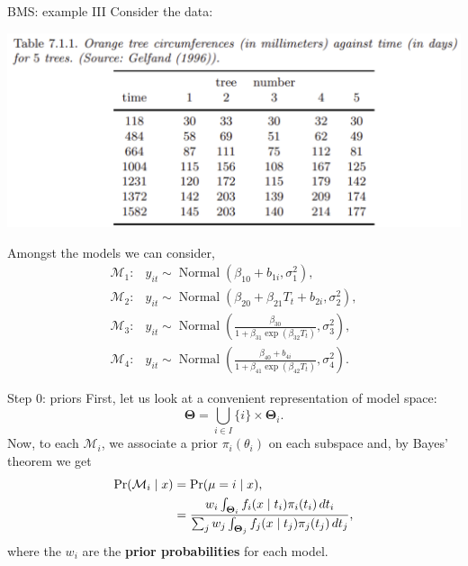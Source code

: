 \begin{frame}{BMS: example III}
Consider the data:
 \begin{center}
 \includegraphics[scale=0.3]{figures/oranges.pdf}
\end{center}
Amongst the models we can consider, 
\begin{align*}
\mathcal{M}_1 :& y_{it} \sim \operatorname{Normal}(\beta_{10} + b_{1i}, \sigma_1^2), \\
\mathcal{M}_2 :& y_{it} \sim \operatorname{Normal}(\beta_{20} + \beta_{21}T_t + b_{2i}, \sigma_2^2) , \\
\mathcal{M}_3 :& y_{it} \sim \operatorname{Normal}\left(\frac{\beta_{30}}{1 + \beta_{31}\exp\left(\beta_{32} T_t\right)}, \sigma_3^2\right), \\
\mathcal{M}_4 :& y_{it} \sim \operatorname{Normal}\left(\frac{\beta_{40} + b_{4i}}{1 + \beta_{41}\exp\left(\beta_{42} T_t\right)}, \sigma_4^2\right).
\end{align*}
\end{frame}
\begin{frame}{Step 0: priors}
First, let us look at a convenient representation of model space:
\begin{equation*}
 \boldsymbol{\Theta} = \bigcup_{i \in I} \{i\} \times \boldsymbol{\Theta}_i.
\end{equation*}
Now, to each $\mathcal{M}_i$, we associate a prior $\pi_i(\theta_i)$  on each subspace and, by Bayes' theorem we get
\begin{align*}
 \operatorname{Pr}(\mathcal{M}_i \mid x) & = \operatorname{Pr}( \mu = i \mid x), \\ 
 &= \frac{w_i \int_{\boldsymbol{\Theta}_i} f_i(x\mid t_i)\pi_i(t_i)\,dt_i}{\sum_{j} w_j \int_{\boldsymbol{\Theta}_j} f_j(x\mid t_j)\pi_j(t_j)\,dt_j },
\end{align*}
where the $w_i$ are the \textbf{prior probabilities} for each model.
\end{frame}
